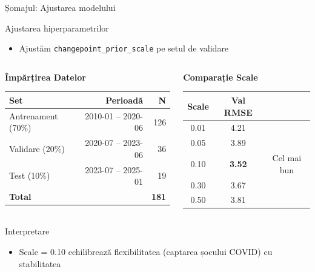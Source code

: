 \documentclass[9pt, aspectratio=169, t]{beamer}
\begin{document}
\begin{frame}{Șomajul: Ajustarea modelului}
    \vspace{-0.1cm}
    {\footnotesize
    \begin{block}{Ajustarea hiperparametrilor}
        \begin{itemize}\setlength{\itemsep}{0pt}
            \item Ajustăm \texttt{changepoint\_prior\_scale} pe setul de validare
        \end{itemize}
    \end{block}
    }

    \vspace{0.05cm}

    {\footnotesize
    \begin{columns}[T]
        \begin{center}
        \textbf{Împărțirea Datelor}
        \begin{tabular}{lrr}
            \toprule
            \textbf{Set} & \textbf{Perioadă} & \textbf{N} \\
            \midrule
            Antrenament (70\%) & 2010-01 -- 2020-06 & 126 \\
            Validare (20\%) & 2020-07 -- 2023-06 & 36 \\
            Test (10\%) & 2023-07 -- 2025-01 & 19 \\
            \midrule
            \textbf{Total} & & \textbf{181} \\
            \bottomrule
        \end{tabular}
        \end{center}

        \begin{center}
        \textbf{Comparație Scale}
        \begin{tabular}{ccc}
            \toprule
            \textbf{Scale} & \textbf{Val RMSE} & \\
            \midrule
            0.01 & 4.21 & \\
            0.05 & 3.89 & \\
            \rowcolor{Forest!20} 0.10 & \textbf{3.52} & Cel mai bun \\
            0.30 & 3.67 & \\
            0.50 & 3.81 & \\
            \bottomrule
        \end{tabular}
        \end{center}
    \end{columns}

    \vspace{0.05cm}

    \begin{alertblock}{Interpretare}
        \begin{itemize}\setlength{\itemsep}{0pt}
            \item Scale = 0.10 echilibrează flexibilitatea (captarea șocului COVID) cu stabilitatea
        \end{itemize}
    \end{alertblock}
    }
\end{frame}
\end{document}

